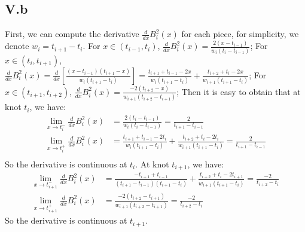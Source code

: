 \documentclass[a4paper]{article}
\begin{document}
\subsection*{V.b}
First, we can compute the derivative $\frac{d}{dx}B_i^2(x)$ for each piece, for simplicity, we denote $w_i=t_{i+1}-t_i$.\newline
For $x\in(t_{i-1},t_i)$, $\frac{d}{dx}B_i^2(x)=\frac{2(x-t_{i-1})}{w_i(t_i-t_{i-1})}$;\newline
For $x\in(t_{i},t_{i+1})$, $\frac{d}{dx}B_i^2(x)=\frac{d}{dx}[\frac{(x-t_{i-1})(t_{i+1}-x)}{w_i(t_{i+1}-t_i)}]=\frac{t_{i+1}+t_{i-1}-2x}{w_i(t_{i+1}-t_i)}+\frac{t_{i+2}+t_i-2x}{w_{i+1}(t_{i+1}-t_{i})}$;\newline
For $x\in(t_{i+1},t_{i+2})$, $\frac{d}{dx}B_i^2(x)=\frac{-2(t_{i+2}-x)}{w_{i+1}(t_{i+2}-t_{i+1})}$;\newline
Then it is easy to obtain that at knot $t_i$, we have:
\begin{align}
  \lim_{x\to t_i^{-}}\frac{d}{dx}B_i^2(x)&=\frac{2(t_i-t_{i-1})}{w_i(t_i-t_{i-1})}=\frac{2}{t_{i+1}-t_{i-1}}\\
  \lim_{x\to t_i^+}\frac{d}{dx}B_i^2(x)&=\frac{t_{i+1}+t_{i-1}-2t_i}{w_i(t_{i+1}-t_i)}+\frac{t_{i+2}+t_i-2t_i}{w_{i+1}(t_{i+1}-t_i)}=\frac{2}{t_{i+1}-t_{i-1}}\\
\end{align}
So the derivative is continuous at $t_i$.\newline
At knot $t_{i+1}$, we have:
\begin{align}
  \lim_{x\to t_{i+1}^-}\frac{d}{dx}B_i^2(x)&=\frac{-t_{i+1}+t_{i-1}}{(t_{i+1}-t_{i-1})(t_{i+1}-t_i)}+\frac{t_{i+2}+t_{i}-2t_{i+1}}{w_{i+1}(t_{i+1}-t_i)}=\frac{-2}{t_{i+2}-t_{i}}\\
  \lim_{x\to t_{i+1}^{+}}\frac{d}{dx}B_i^2(x)&=\frac{-2(t_{i+2}-t_{i+1})}{w_{i+1}(t_{i+2}-t_{i+1})}=\frac{-2}{t_{i+2}-t_{i}}
\end{align}
So the derivative is continuous at $t_{i+1}$.
\end{document}
